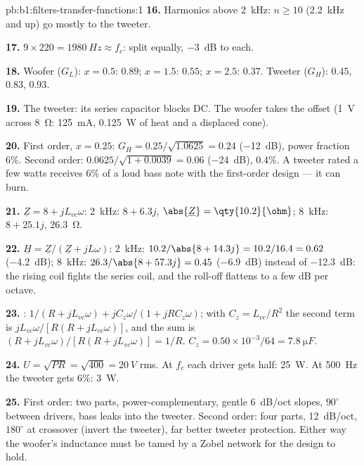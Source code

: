 \begin{solution}{pb:b1:filters-transfer-functions:1}
\textbf{16.} Harmonics above \qty{2}{kHz}: $n \geq 10$ (\qty{2.2}{kHz}
and up) go mostly to the tweeter.

\textbf{17.} $9 \times 220 = \qty{1980}{Hz} \approx f_c$: split equally,
\qty{-3}{dB} to each.

\textbf{18.} Woofer ($G_L$): $x = 0.5$: $0.89$; $x = 1.5$: $0.55$; $x = 2.5$:
$0.37$. Tweeter ($G_H$): $0.45$, $0.83$, $0.93$.

\textbf{19.} The tweeter: its series capacitor blocks DC. The woofer
takes the offset (\qty{1}{V} across \qty{8}{\ohm}: \qty{125}{mA},
\qty{0.125}{W} of heat and a displaced cone).

\textbf{20.} First order, $x = 0.25$: $G_H = 0.25/\sqrt{1.0625} = 0.24$
(\qty{-12}{dB}), power fraction $6\%$. Second order: $0.0625/\sqrt{1 +
0.0039} = 0.06$ (\qty{-24}{dB}), $0.4\%$. A tweeter rated a few watts
receives $6\%$ of a loud bass note with the first-order design --- it can
burn.

\textbf{21.} $\underline Z = 8 + jL_{vc}\omega$: \qty{2}{kHz}: $8 + 6.3j$,
$\abs{\underline Z} = \qty{10.2}{\ohm}$; \qty{8}{kHz}: $8 + 25.1j$,
\qty{26.3}{\ohm}.

\textbf{22.} $\underline H = \underline Z/(\underline Z + jL\omega)$:
\qty{2}{kHz}: $10.2/\abs{8 + 14.3j} = 10.2/16.4 = 0.62$ (\qty{-4.2}{dB});
\qty{8}{kHz}: $26.3/\abs{8 + 57.3j} = 0.45$ (\qty{-6.9}{dB}) instead of
\qty{-12.3}{dB}: the rising coil  fights the series coil, and
the roll-off flattens to a few dB per octave.

\textbf{23.} : $1/(R + jL_{vc}\omega) + jC_z\omega/(1 + jRC_z\omega)$;
with $C_z = L_{vc}/R^2$ the second term is $jL_{vc}\omega/[R(R +
jL_{vc}\omega)]$, and the sum is $(R + jL_{vc}\omega)/[R(R + jL_{vc}\omega)]
= 1/R$. $C_z = 0.50\times10^{-3}/64 = \qty{7.8}{\micro F}$.

\textbf{24.} $U = \sqrt{PR} = \sqrt{400} = \qty{20}{V}$ rms. At $f_c$ each
driver gets half: \qty{25}{W}. At \qty{500}{Hz} the tweeter gets $6\%$:
\qty{3}{W}.

\textbf{25.} First order: two parts, power-complementary, gentle
\qty{6}{dB/oct} slopes, $90^\circ$ between drivers, bass leaks into the
tweeter. Second order: four parts, \qty{12}{dB/oct}, $180^\circ$ at
crossover (invert the tweeter), far better tweeter protection. Either
way the woofer's inductance must be tamed by a Zobel network for the
design to hold.
\end{solution}
